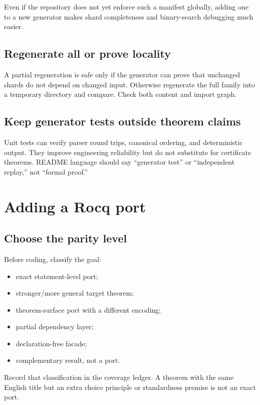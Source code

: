 \documentclass[
  10pt,
  a4paper,
  twoside,
  open=any,
  parskip=half,
  headings=big
]{scrreprt}
\begin{document}
Even if the repository does not yet enforce such a manifest globally, adding
one to a new generator makes shard completeness and binary-search debugging
much easier.

\subsection{Regenerate all or prove locality}

A partial regeneration is safe only if the generator can prove that unchanged
shards do not depend on changed input.  Otherwise regenerate the full family
into a temporary directory and compare.  Check both content and import graph.

\subsection{Keep generator tests outside theorem claims}

Unit tests can verify parser round trips, canonical ordering, and deterministic
output.  They improve engineering reliability but do not substitute for
certificate theorems.  README language should say ``generator test'' or
``independent replay,'' not ``formal proof.''

\section{Adding a Rocq port}

\subsection{Choose the parity level}

Before coding, classify the goal:

\begin{itemize}
  \item exact statement-level port;
  \item stronger/more general target theorem;
  \item theorem-surface port with a different encoding;
  \item partial dependency layer;
  \item declaration-free facade;
  \item complementary result, not a port.
\end{itemize}

Record that classification in the coverage ledger.  A theorem with the same
English title but an extra choice principle or standardness premise is not an
exact port.
\end{document}
